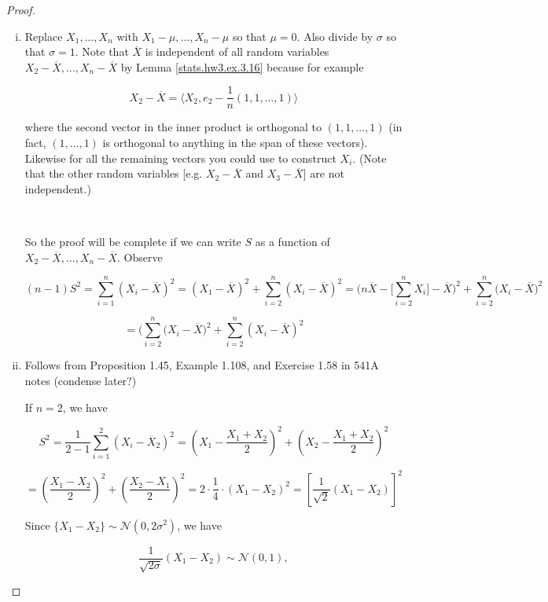 \begin{proof}

\begin{enumerate}[(i)]

\item Replace \(X_1, \ldots, X_n\) with \(X_1 - \mu, \ldots, X_n - \mu\) so that \(\mu = 0\). Also divide by \(\sigma\) so that \(\sigma=1\). Note that \(\overline{X}\) is independent of all random variables \(X_2 - \overline{X}, \ldots, X_n - \overline{X}\) by Lemma \ref{stats.hw3.ex.3.16} because for example

\[
X_2 - \overline{X} = \langle X_2, e_2 - \frac{1}{n} (1, 1, \ldots, 1) \rangle
\]

where the second vector in the inner product is orthogonal to \((1, 1, \ldots, 1 )\) (in fact, \((1, \ldots, 1)\) is orthogonal to anything in the span of these vectors). Likewise for all the remaining vectors you could use to construct \(X_i\). (Note that the other random variables [e.g. \(X_2 - \overline{X}\) and \(X_3 - \overline{X}\)] are not independent.)

\

So the proof will be complete if we can write \(S\) as a function of \(X_2 - \overline{X}, \ldots, X_n - \overline{X}\). Observe

\[
(n-1)S^2 = \sum_{i=1}^n (X_i - \overline{X})^2 = (X_1 - \overline{X})^2 + \sum_{i=2}^n (X_i - \overline{X})^2 = \bigg( n \overline{X} - \bigg[ \sum_{i=2}^n X_i \bigg] - \overline{X} \bigg) ^2 + \sum_{i=2}^n \bigg( X_i - \overline{X} \bigg)^2 
\]

\[
= \bigg(\sum_{i=2}^n (X_i - \overline{X}  \bigg)^2 + \sum_{i=2}^n (X_i - \overline{X})^2 
\]

\item Follows from Proposition 1.45, Example 1.108, and Exercise 1.58 in 541A notes (condense later?)

If \(n = 2\), we have

\[
S^2 =  \frac{1}{2-1} \sum_{i=1}^2 (X_i - \overline{X}_2)^2  =   \left(X_1 - \frac{X_1 + X_2}{2} \right)^2 + \left(X_2 - \frac{X_1 + X_2}{2} \right)^2
\]

\[
=    \left( \frac{X_1 - X_2}{2} \right)^2 + \left( \frac{X_2 - X_1}{2} \right)^2 =   2 \cdot \frac{1}{4} \cdot (X_1 - X_2)^2  =   \left[  \frac{1}{\sqrt{2}} (X_1 - X_2) \right]^2 
\]

Since \(\{X_1 - X_2\} \sim \mathcal{N}(0, 2 \sigma^2)\), we have 

\[
 \frac{1}{\sqrt{2 \sigma}} (X_1 - X_2)  \sim  \mathcal{N}(0,1),
\]


\end{enumerate}
\end{proof}
